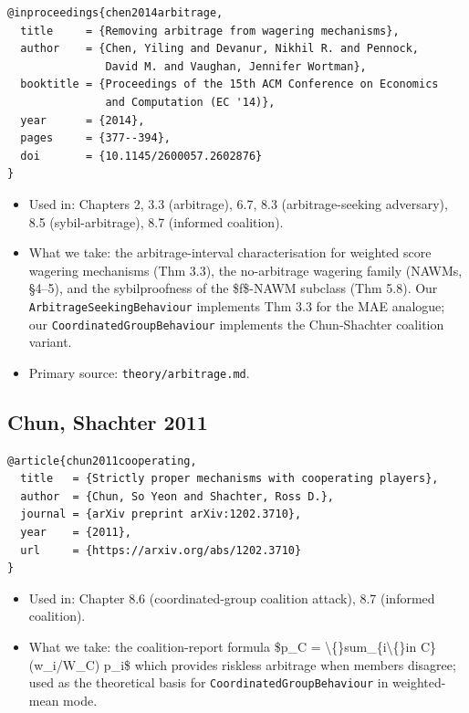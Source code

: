 \documentclass[11pt,a4paper,openany]{report}
\begin{document}
\begin{verbatim}
@inproceedings{chen2014arbitrage,
  title     = {Removing arbitrage from wagering mechanisms},
  author    = {Chen, Yiling and Devanur, Nikhil R. and Pennock,
               David M. and Vaughan, Jennifer Wortman},
  booktitle = {Proceedings of the 15th ACM Conference on Economics
               and Computation (EC '14)},
  year      = {2014},
  pages     = {377--394},
  doi       = {10.1145/2600057.2602876}
}
\end{verbatim}

\begin{itemize}
  \item Used in: Chapters 2, 3.3 (arbitrage), 6.7, 8.3 (arbitrage-seeking
    adversary), 8.5 (sybil-arbitrage), 8.7 (informed coalition).
  \item What we take: the arbitrage-interval characterisation for weighted
    score wagering mechanisms (Thm 3.3), the no-arbitrage wagering
    family (NAWMs, §4--5), and the sybilproofness of the \$f\$-NAWM
    subclass (Thm 5.8). Our \texttt{ArbitrageSeekingBehaviour} implements
    Thm 3.3 for the MAE analogue; our \texttt{CoordinatedGroupBehaviour}
    implements the Chun-Shachter coalition variant.
  \item Primary source: \texttt{theory/arbitrage.md}.
\end{itemize}

\subsection{Chun, Shachter 2011}

\begin{verbatim}
@article{chun2011cooperating,
  title   = {Strictly proper mechanisms with cooperating players},
  author  = {Chun, So Yeon and Shachter, Ross D.},
  journal = {arXiv preprint arXiv:1202.3710},
  year    = {2011},
  url     = {https://arxiv.org/abs/1202.3710}
}
\end{verbatim}

\begin{itemize}
  \item Used in: Chapter 8.6 (coordinated-group coalition attack), 8.7
    (informed coalition).
  \item What we take: the coalition-report formula
    \$p\_C = \textbackslash\{\}sum\_\{i\textbackslash\{\}in C\}(w\_i/W\_C) p\_i\$ which provides riskless arbitrage
    when members disagree; used as the theoretical basis for
    \texttt{CoordinatedGroupBehaviour} in weighted-mean mode.
\end{itemize}
\end{document}
